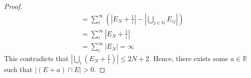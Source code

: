 \begin{answer}
\begin{proof}
\begin{equation}
\begin{aligned}
                &= \sum_{i}^{\infty} \left(\left\lvert E_N + \tfrac{1}{i}\right\rvert - \left\lvert \bigcup_{j \in \mathbb{N}}E_{ij}\right\rvert\right)\\
                &= \sum_{i}^{\infty} \left\lvert E_N + \tfrac{1}{i}\right\rvert\\
                &= \sum_{i}^{\infty} \left\lvert E_N \right\rvert = \infty
            \end{aligned}
        \end{equation}
        This contradicts that $\left\lvert \bigcup_i (E_N + \tfrac{1}{i}) \right\rvert \leq 2N+2$. Hence, there exists some $a \in \mathbb{R}$ such that $\lvert (E + a) \cap E \rvert > 0$.
    \end{proof}
\end{answer}